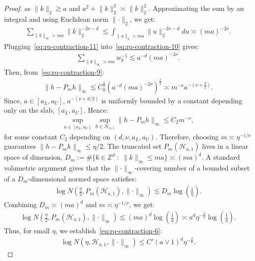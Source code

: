 \documentclass[final,12pt]{colt2026} %
\begin{document}
\begin{proof}
as $\lVert k \rVert_{2} \gtrsim a$ and $a^{2} + \lVert k \rVert_{2}^{2} \asymp \lVert k  \rVert_2^2$. Approximating the sum by an integral and using Euclidean norm $\lVert \cdot \rVert_2$, we get:
\begin{align}
\label{eq:rq-contraction-11}
\sum_{\lVert k \rVert_{\infty} > ma}\lVert k \rVert_{2}^{-2\nu-d} \lesssim \int_{\lVert u \rVert_{2} > ma}\lVert u \rVert_2^{-2\nu - d}du \asymp (ma)^{-2\nu}.
\end{align}
Plugging~\eqref{eq:rq-contraction-11} into~\eqref{eq:rq-contraction-10} gives:
\begin{align}
\label{eq:rq-contraction-12}
\sum_{\lVert k \rVert_{\infty} > ma}w_k^{-1}\lesssim a^{-d}(ma)^{-2\nu}.
\end{align}
Then, from~\eqref{eq:rq-contraction-9}:
\begin{align}
\label{eq:rq-contraction-13}
\lVert h - P_m h\rVert_{\infty} \lesssim C_0^{\frac{1}{2}}\left(a^{-d}(ma)^{-2\nu}\right)^{\frac{1}{2}} \asymp m^{-\nu}a^{-(\nu + \frac{d}{2})}.
\end{align}
Since, $a\in [a_L, a_U]$, $a^{-(\nu+d/2)}$ is uniformly bounded by a constant depending only on the slab, $[a_L, a_U]$. Hence:
\begin{align}
\label{eq:rq-contraction-14}
\sup_{a\in [a_L, a_U]}\sup_{h\in \mathcal{H}_{a, 1}}\lVert h - P_m h\rVert_{\infty} \leq C_2 m^{-\nu},
\end{align}
for some constant $C_2$ depending on $(d, \nu, a_L, a_U)$. Therefore, choosing $m\asymp \eta^{-1/\nu}$ guarantees $\lVert h - P_mh\rVert_{\infty} \leq \eta/2$. The truncated set $P_m(\mathcal{H}_{a, 1})$ lives in a linear space of dimension, $D_m:= \# \{k\in \mathbb{Z}^{d}\;:\; \lVert k \rVert_{\infty} \leq ma\} \asymp (ma)^{d}$. A standard volumetric argument gives that the $\lVert \cdot \rVert_{\infty}$-covering number of a bounded subset of a $D_m$-dimensional normed space satisfies:
\begin{align}
\label{eq:rq-contraction-15}
\log N\left(\frac{\eta}{2}, P_m(\mathcal{H}_{a, 1}), \lVert \cdot \rVert_{\infty}\right) \lesssim D_m \log\left(\frac{1}{\eta}\right).
\end{align}
Combining $D_m\asymp (ma)^{d}$ and $m\asymp \eta^{-1/\nu}$, we get:
\begin{align}
\label{eq:rq-contraction-16}
\log N\left(\frac{\eta}{2}, P_m(\mathcal{H}_{a, 1}), \lVert \cdot \rVert_{\infty}\right) \lesssim (ma)^{d}\log\left(\frac{1}{\eta}\right) \asymp a^{d}\eta^{-\frac{d}{\nu}}\log\left(\frac{1}{\eta}\right).
\end{align}
Thus, for small $\eta$, we establish~\eqref{eq:rq-contraction-6}:
\begin{align*}
    \log N(\eta, \mathcal{H}_{a, 1}, \lVert \cdot \rVert_{\infty}) \leq C'(a \vee 1)^{d} \eta^{-\frac{d}{\nu}}.
\end{align*}


\end{proof}
\end{document}
